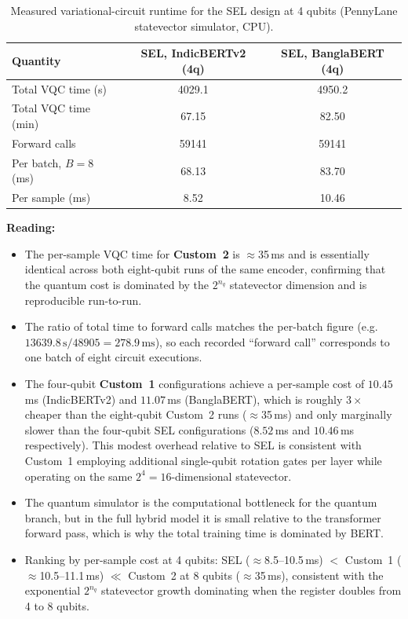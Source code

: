 \documentclass[11pt]{article}
\begin{document}
\begin{table}[h!]
\centering
\small
\begin{threeparttable}
\begin{tabular}{lcc}
\toprule
\textbf{Quantity} & \textbf{SEL, IndicBERTv2 (4q)} & \textbf{SEL, BanglaBERT (4q)} \\
\midrule
Total VQC time (s)        & 4029.1  & 4950.2  \\
Total VQC time (min)      & 67.15   & 82.50   \\
Forward calls             & 59141   & 59141   \\
Per batch, $B=8$ (ms)     & 68.13   & 83.70   \\
Per sample (ms)           & 8.52    & 10.46   \\
\bottomrule
\end{tabular}
\end{threeparttable}
\caption{Measured variational-circuit runtime for the SEL design at 4 qubits (PennyLane statevector simulator, CPU).}
\end{table}

\noindent\textbf{Reading:}
\begin{itemize}
    \item The per-sample VQC time for \textbf{Custom~2} is $\approx$35\,ms and is essentially
    identical across both eight-qubit runs of the same encoder, confirming that the quantum cost
    is dominated by the $2^{n_q}$ statevector dimension and is reproducible run-to-run.
    \item The ratio of total time to forward calls matches the per-batch figure
    (e.g.\ $13639.8\,\text{s} / 48905 = 278.9\,\text{ms}$), so each recorded ``forward call''
    corresponds to one batch of eight circuit executions.
    \item The four-qubit \textbf{Custom~1} configurations achieve a per-sample cost of
    $10.45$\,ms (IndicBERTv2) and $11.07$\,ms (BanglaBERT), which is roughly $3\times$ cheaper
    than the eight-qubit Custom~2 runs ($\approx$35\,ms) and only marginally slower than the
    four-qubit SEL configurations ($8.52$\,ms and $10.46$\,ms respectively). This modest
    overhead relative to SEL is consistent with Custom~1 employing additional single-qubit
    rotation gates per layer while operating on the same $2^4 = 16$-dimensional statevector.
    \item The quantum simulator is the computational bottleneck for the quantum branch, but
    in the full hybrid model it is small relative to the transformer forward pass, which is why
    the total training time is dominated by BERT.
    \item Ranking by per-sample cost at 4 qubits:
    SEL ($\approx$8.5--10.5\,ms) $<$ Custom~1 ($\approx$10.5--11.1\,ms) $\ll$ Custom~2
    at 8 qubits ($\approx$35\,ms), consistent with the exponential $2^{n_q}$ statevector growth
    dominating when the register doubles from 4 to 8 qubits.
\end{itemize}
\end{document}
